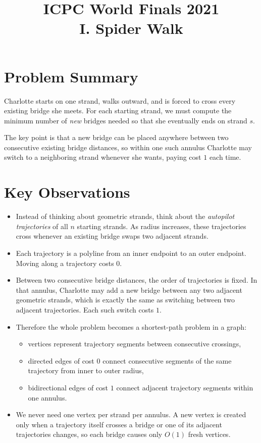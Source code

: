 \documentclass[11pt]{article}
\title{ICPC World Finals 2021\\I. Spider Walk}
\author{}
\date{}
\begin{document}
\maketitle

\section*{Problem Summary}

Charlotte starts on one strand, walks outward, and is forced to cross every existing bridge she meets.
For each starting strand, we must compute the minimum number of \emph{new} bridges needed so that she
eventually ends on strand $s$.

The key point is that a new bridge can be placed anywhere between two consecutive existing bridge
distances, so within one such annulus Charlotte may switch to a neighboring strand whenever she wants,
paying cost $1$ each time.

\section*{Key Observations}

\begin{itemize}[leftmargin=*]
    \item Instead of thinking about geometric strands, think about the \emph{autopilot trajectories} of all
    $n$ starting strands. As radius increases, these trajectories cross whenever an existing bridge swaps
    two adjacent strands.

    \item Each trajectory is a polyline from an inner endpoint to an outer endpoint. Moving along a
    trajectory costs $0$.

    \item Between two consecutive bridge distances, the order of trajectories is fixed. In that annulus,
    Charlotte may add a new bridge between any two adjacent geometric strands, which is exactly the same
    as switching between two adjacent trajectories. Each such switch costs $1$.

    \item Therefore the whole problem becomes a shortest-path problem in a graph:
    \begin{itemize}[leftmargin=*]
        \item vertices represent trajectory segments between consecutive crossings,
        \item directed edges of cost $0$ connect consecutive segments of the same trajectory from inner to
        outer radius,
        \item bidirectional edges of cost $1$ connect adjacent trajectory segments within one annulus.
    \end{itemize}

    \item We never need one vertex per strand per annulus. A new vertex is created only when a trajectory
    itself crosses a bridge or one of its adjacent trajectories changes, so each bridge causes only $O(1)$
    fresh vertices.
\end{itemize}
\end{document}
